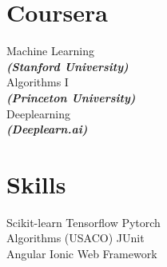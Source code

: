 \documentclass[]{deedy-resume-openfont}
\begin{document}
\begin{minipage}[t]{0.33\textwidth}
\section{Coursera}
Machine Learning \\
{\footnotesize \textit{\textbf{(Stanford University)}}} \\

\vspace{2mm}
Algorithms I \\
{\footnotesize \textit{\textbf{(Princeton University)}}} \\

\vspace{2mm}
Deeplearning \\
{\footnotesize \textit{\textbf{(Deeplearn.ai)}}} \\
\sectionsep


\section{Skills}

\textbullet{} Scikit-learn \textbullet{} Tensorflow \textbullet{} Pytorch \\

\vspace{2mm}
\textbullet{} Algorithms (USACO) \textbullet{} JUnit \\

\vspace{2mm}
\textbullet{} Angular \textbullet{} Ionic Web Framework \\
\sectionsep

%
%

\end{minipage} 
\hfill
\end{document}

